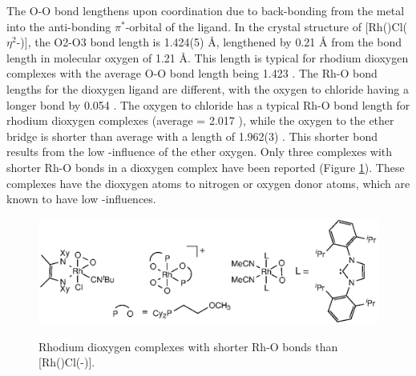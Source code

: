 The O-O bond lengthens upon coordination due to back-bonding from the metal into the anti-bonding $\pi^*$-orbital of the ligand.  In the crystal structure of [Rh(\tBuxantphos)Cl($\eta^2$-)], the O2-O3 bond length is 1.424(5) \si{\angstrom}, lengthened by 0.21 \si{\angstrom} from the bond length in molecular oxygen of 1.21 \si{\angstrom}.\cite{SI2002}  This length is typical for rhodium dioxygen complexes with the average O-O bond length being 1.423 \A.\cite{Allen2002}  The Rh-O bond lengths for the dioxygen ligand are different, with the oxygen \trans{} to chloride having a longer bond by 0.054 \A.  The oxygen \trans{} to chloride has a typical Rh-O bond length for rhodium dioxygen complexes (average = 2.017 \A), while the oxygen \trans{} to the ether bridge is shorter than average with a length of 1.962(3) \A.  This shorter bond results from the low \trans-influence of the ether oxygen.\cite{Appleton1978, Rigamonti2010}  Only three complexes with shorter Rh-O bonds in a dioxygen complex have been reported (Figure \ref{ShorterRhOcomplexes}).\cite{Lindner1993b, Penner2011, Wechsler2012} These complexes have the dioxygen atoms \trans{} to nitrogen or oxygen donor atoms, which are known to have low \trans-influences.\cite{Appleton1978, Rigamonti2010}  


\begin{figure}[htp]
\begin{center}
\vspace{0.5cm}
\includegraphics{../Figures/OtherRhO2complexes.eps}
\caption[Rhodium dioxygen complexes with shorter Rh-O bonds than \texorpdfstring{[Rh(\tBuxantphos)(-)Cl{]}} R]{Rhodium dioxygen complexes with shorter Rh-O bonds than \texorpdfstring{[Rh(\tBuxantphos)Cl(-){]}} R.}
\vspace{0.2cm}
\label{ShorterRhOcomplexes}
\end{center}
\end{figure}
\vspace{0.2cm}

